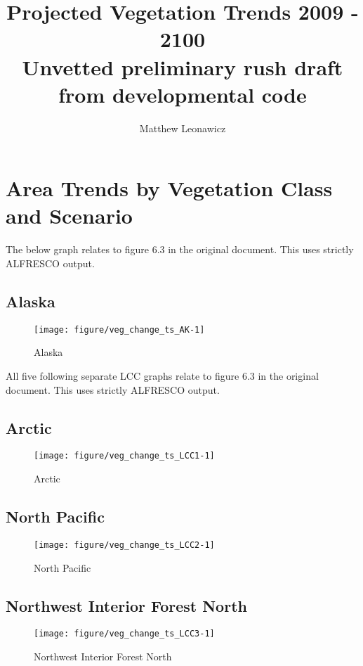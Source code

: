 \documentclass{article}\usepackage[]{graphicx}\usepackage[]{color}
\makeatletter
\def\maxwidth{ %
  \ifdim\Gin@nat@width>\linewidth
    \linewidth
  \else
    \Gin@nat@width
  \fi
}
\makeatother
\begin{document}
\title{Projected Vegetation Trends 2009 - 2100 \\ \large Unvetted preliminary rush draft from developmental code}
\author{Matthew Leonawicz}
\maketitle

\setlength{\aboverulesep}{0.2pt}
\setlength{\belowrulesep}{0.2pt}





\section{Area Trends by Vegetation Class and Scenario}
The below graph relates to figure 6.3 in the original document.
This uses strictly ALFRESCO output.

\subsection{Alaska}
\begin{figure}[H]
\texttt{[image: figure/veg\_change\_ts\_AK-1]} \caption[Alaska]{Alaska\label{fig:veg_change_ts_AK}}
\end{figure}



All five following separate LCC graphs relate to figure 6.3 in the original document.
This uses strictly ALFRESCO output.

\subsection{Arctic}
\begin{figure}[H]
\texttt{[image: figure/veg\_change\_ts\_LCC1-1]} \caption[Arctic]{Arctic\label{fig:veg_change_ts_LCC1}}
\end{figure}



\subsection{North Pacific}
\begin{figure}[H]
\texttt{[image: figure/veg\_change\_ts\_LCC2-1]} \caption[North Pacific]{North Pacific\label{fig:veg_change_ts_LCC2}}
\end{figure}



\subsection{Northwest Interior Forest North}
\begin{figure}[H]
\texttt{[image: figure/veg\_change\_ts\_LCC3-1]} \caption[Northwest Interior Forest North]{Northwest Interior Forest North\label{fig:veg_change_ts_LCC3}}
\end{figure}
\end{document}
